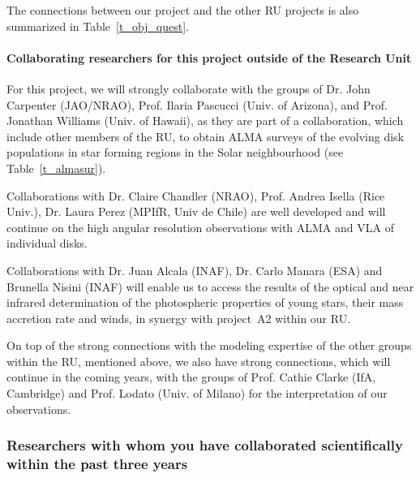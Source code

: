 \documentclass[10pt,fleqn,twoside]{article}
\begin{document}
The connections between our project and the other RU projects is also summarized in Table~\ref{t_obj_quest}.

\paragraph{Collaborating researchers for this project outside of
  the Research Unit}

For this project, we will strongly collaborate with the groups of Dr. John Carpenter (JAO/NRAO), Prof. Ilaria Pascucci (Univ. of Arizona), and Prof. Jonathan Williams (Univ. of Hawaii), as they are part of a collaboration, which include other members of the RU, to obtain ALMA surveys of the evolving disk populations in star forming regions in the Solar neighbourhood (see Table~\ref{t_almasur}). 

Collaborations with Dr. Claire Chandler (NRAO), Prof. Andrea Isella (Rice Univ.), Dr. Laura Perez (MPIfR, Univ de Chile) are well developed and will continue on the high angular resolution observations with ALMA and VLA of individual disks.

Collaborations with Dr. Juan Alcala (INAF), Dr. Carlo Manara (ESA) and Brunella Nisini (INAF) will enable us to access the results of the optical and near infrared determination of the photospheric properties of young stars, their mass accretion rate and winds, in synergy with project~A2 within our RU.

On top of the strong connections with the modeling expertise of the other groups within the RU, 
mentioned above, we also have strong connections, which will continue in the coming years, with the groups of Prof. Cathie Clarke (IfA, Cambridge) and Prof. Lodato (Univ. of Milano) for the interpretation of our observations. 

\subsubsection{Researchers with whom you have collaborated scientifically within the past three years}

\end{document}
